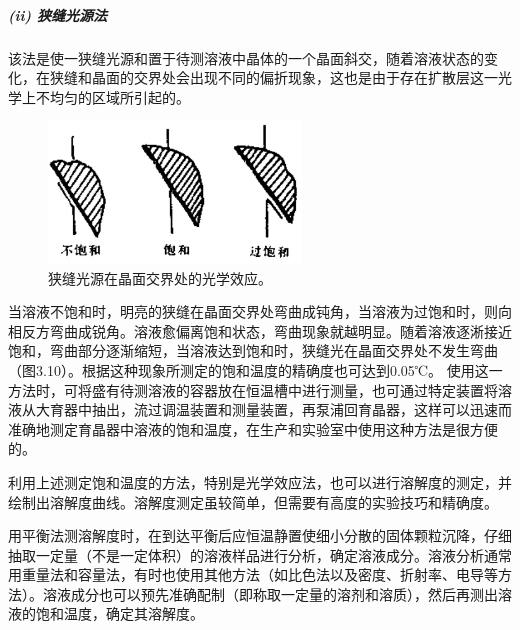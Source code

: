 \subparagraph{(ii) 狭缝光源法}
该法是使一狭缝光源和置于待测溶液中晶体的一个晶面斜交，随着溶液状态的变化，在狭缝和晶面的交界处会出现不同的偏折现象，这也是由于存在扩散层这一光学上不均匀的区域所引起的。

\begin{figure}[htb]
 \centering
 \includegraphics[width=0.6\textwidth]{fig/cp03/img3.10.jpg}
 \caption{狭缝光源在晶面交界处的光学效应。} 
\end{figure}

当溶液不饱和时，明亮的狭缝在晶面交界处弯曲成钝角，当溶液为过饱和时，则向相反方弯曲成锐角。溶液愈偏离饱和状态，弯曲现象就越明显。随着溶液逐淅接近饱和，弯曲部分逐渐缩短，当溶液达到饱和时，狭缝光在晶面交界处不发生弯曲（图3.10）。根据这种现象所测定的饱和温度的精确度也可达到0.05℃。 使用这一方法时，可将盛有待测溶液的容器放在恒温槽中进行测量，也可通过特定装置将溶液从大育器中抽出，流过调温装置和测量装置，再泵浦回育晶器，这样可以迅速而准确地测定育晶器中溶液的饱和温度，在生产和实验室中使用这种方法是很方便的。

利用上述测定饱和温度的方法，特别是光学效应法，也可以进行溶解度的测定，并绘制出溶解度曲线。溶解度测定虽较简单，但需要有高度的实验技巧和精确度。

用平衡法测溶解度时，在到达平衡后应恒温静置使细小分散的固体颗粒沉降，仔细抽取一定量（不是一定体积）的溶液样品进行分析，确定溶液成分。溶液分析通常用重量法和容量法，有时也使用其他方法（如比色法以及密度、折射率、电导等方法）。溶液成分也可以预先准确配制（即称取一定量的溶剂和溶质），然后再测出溶液的饱和温度，确定其溶解度。

